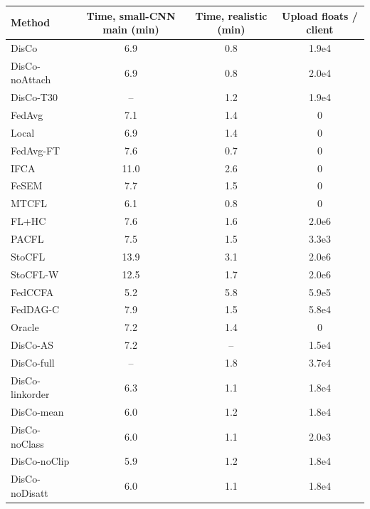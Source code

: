{\scriptsize
\begin{tabular}{l c c c}
\toprule
Method & Time, small-CNN main (min) & Time, realistic (min) & Upload floats / client \\
\midrule
DisCo & 6.9 & 0.8 & 1.9e4 \\
DisCo-noAttach & 6.9 & 0.8 & 2.0e4 \\
DisCo-T30 & -- & 1.2 & 1.9e4 \\
FedAvg & 7.1 & 1.4 & 0 \\
Local & 6.9 & 1.4 & 0 \\
FedAvg-FT & 7.6 & 0.7 & 0 \\
IFCA & 11.0 & 2.6 & 0 \\
FeSEM & 7.7 & 1.5 & 0 \\
MTCFL & 6.1 & 0.8 & 0 \\
FL+HC & 7.6 & 1.6 & 2.0e6 \\
PACFL & 7.5 & 1.5 & 3.3e3 \\
StoCFL & 13.9 & 3.1 & 2.0e6 \\
StoCFL-W & 12.5 & 1.7 & 2.0e6 \\
FedCCFA & 5.2 & 5.8 & 5.9e5 \\
FedDAG-C & 7.9 & 1.5 & 5.8e4 \\
Oracle & 7.2 & 1.4 & 0 \\
DisCo-AS & 7.2 & -- & 1.5e4 \\
DisCo-full & -- & 1.8 & 3.7e4 \\
DisCo-linkorder & 6.3 & 1.1 & 1.8e4 \\
DisCo-mean & 6.0 & 1.2 & 1.8e4 \\
DisCo-noClass & 6.0 & 1.1 & 2.0e3 \\
DisCo-noClip & 5.9 & 1.2 & 1.8e4 \\
DisCo-noDisatt & 6.0 & 1.1 & 1.8e4 \\
\bottomrule
\end{tabular}
}
